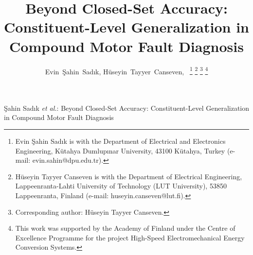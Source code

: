 \documentclass[journal]{IEEEtran}
\begin{document}
\title{Beyond Closed-Set Accuracy: Constituent-Level Generalization in
Compound Motor Fault Diagnosis}

\author{Evin~\c{S}ahin~Sad{\i}k,
        H\"useyin~Tayyer~Canseven,~%
\thanks{Evin \c{S}ahin Sad{\i}k is with the Department of Electrical and
Electronics Engineering, K\"utahya Dumlup{\i}nar University, 43100
K\"utahya, Turkey (e-mail: evin.sahin@dpu.edu.tr).}%
\thanks{H\"useyin Tayyer Canseven is with the Department of Electrical
Engineering, Lappeenranta-Lahti University of Technology (LUT University),
53850 Lappeenranta, Finland (e-mail: huseyin.canseven@lut.fi).}%
\thanks{Corresponding author: H\"useyin Tayyer Canseven.}%
\thanks{This work was supported by the Academy of Finland under the Centre
of Excellence Programme for the project High-Speed Electromechanical Energy
Conversion Systems.}}

%
{\c{S}ahin Sad{\i}k \MakeLowercase{\textit{et al.}}: Beyond Closed-Set
Accuracy: Constituent-Level Generalization in Compound Motor Fault
Diagnosis}

\maketitle
\end{document}
